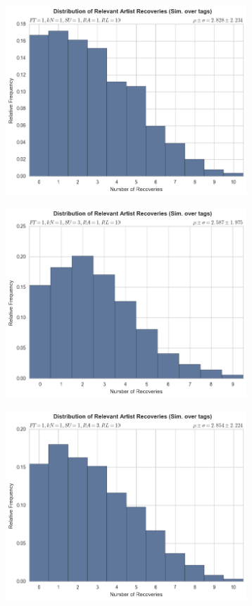 \documentclass[12pt]{article}
\begin{document}
\begin{figure}[h!]
\centering
  \begin{subfigure}
      \centering
    \includegraphics[height=2.8in]{tags,FT=1,kN=1,SU=1,RA=1,RL=10.png}
  \end{subfigure}
  \begin{subfigure}
      \centering
    \includegraphics[height=2.8in]{tags,FT=1,kN=1,SU=3,RA=1,RL=10.png}
  \end{subfigure}
  \begin{subfigure}
      \centering
    \includegraphics[height=2.8in]{tags,FT=1,kN=1,SU=1,RA=3,RL=10.png}

\end{subfigure}
\end{figure}
\end{document}
